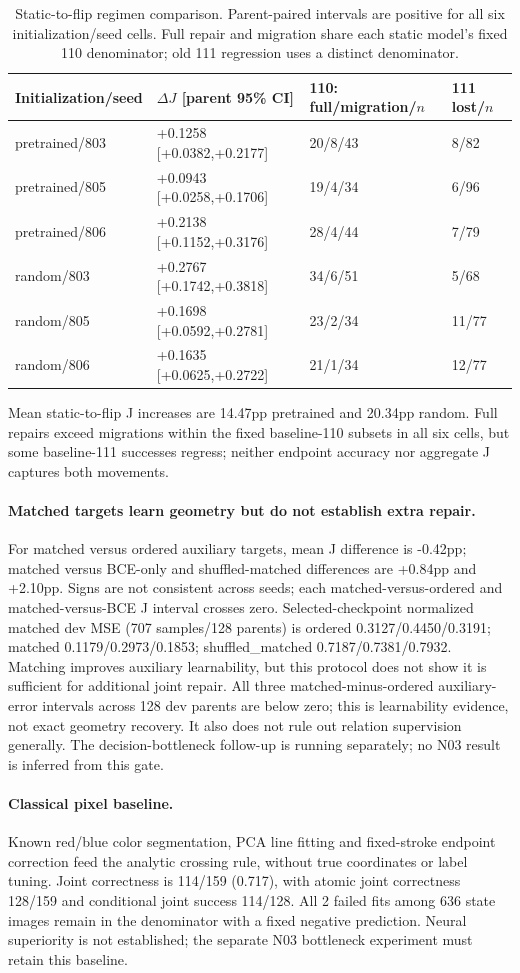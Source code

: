 \begin{table}[t]\centering\small\begin{tabular}{@{}llll@{}}\toprule
Initialization/seed & $\Delta J$ [parent 95\% CI] & 110: full/migration/$n$ & 111 lost/$n$ \\
\midrule
pretrained/803 & +0.1258 [+0.0382,+0.2177] & 20/8/43 & 8/82 \\
pretrained/805 & +0.0943 [+0.0258,+0.1706] & 19/4/34 & 6/96 \\
pretrained/806 & +0.2138 [+0.1152,+0.3176] & 28/4/44 & 7/79 \\
random/803 & +0.2767 [+0.1742,+0.3818] & 34/6/51 & 5/68 \\
random/805 & +0.1698 [+0.0592,+0.2781] & 23/2/34 & 11/77 \\
random/806 & +0.1635 [+0.0625,+0.2722] & 21/1/34 & 12/77 \\
\bottomrule\end{tabular}\caption{Static-to-flip regimen comparison. Parent-paired intervals are positive for all six initialization/seed cells. Full repair and migration share each static model's fixed 110 denominator; old 111 regression uses a distinct denominator.}\end{table}
Mean static-to-flip J increases are 14.47pp pretrained and 20.34pp random. Full repairs exceed migrations within the fixed baseline-110 subsets in all six cells, but some baseline-111 successes regress; neither endpoint accuracy nor aggregate J captures both movements.
\paragraph{Matched targets learn geometry but do not establish extra repair.} For matched versus ordered auxiliary targets, mean J difference is -0.42pp; matched versus BCE-only and shuffled-matched differences are +0.84pp and +2.10pp. Signs are not consistent across seeds; each matched-versus-ordered and matched-versus-BCE J interval crosses zero. Selected-checkpoint normalized matched dev MSE (707 samples/128 parents) is ordered 0.3127/0.4450/0.3191; matched 0.1179/0.2973/0.1853; shuffled\_matched 0.7187/0.7381/0.7932. Matching improves auxiliary learnability, but this protocol does not show it is sufficient for additional joint repair. All three matched-minus-ordered auxiliary-error intervals across 128 dev parents are below zero; this is learnability evidence, not exact geometry recovery. It also does not rule out relation supervision generally. The decision-bottleneck follow-up is running separately; no N03 result is inferred from this gate.
\paragraph{Classical pixel baseline.} Known red/blue color segmentation, PCA line fitting and fixed-stroke endpoint correction feed the analytic crossing rule, without true coordinates or label tuning. Joint correctness is 114/159 (0.717), with atomic joint correctness 128/159 and conditional joint success 114/128. All 2 failed fits among 636 state images remain in the denominator with a fixed negative prediction. Neural superiority is not established; the separate N03 bottleneck experiment must retain this baseline.

